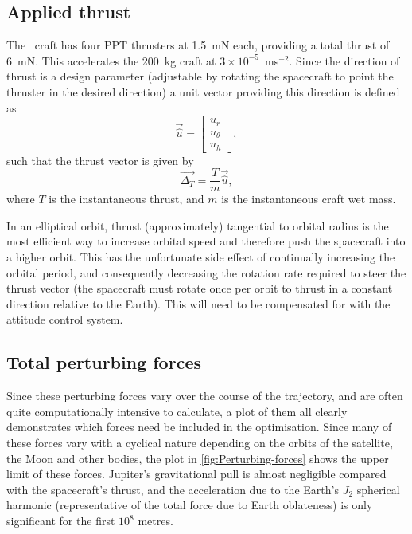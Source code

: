 
 

\subsection{Applied thrust} \label{sub:Applied-Thrust}

The \BW\ craft has four PPT thrusters at 1.5~mN each, providing a total thrust of 6~mN. This accelerates the 200~kg craft at $3\times10^{-5}$~ms$^{-2}$. Since the direction of thrust is a design parameter (adjustable by rotating the spacecraft to point the thruster in the desired direction) a unit vector providing this direction is defined as
\begin{equation} \label{eq:thrust-vector}
\vec{\hat{u}}=\left[\begin{array}{c}
u_{r}\\
u_{\theta}\\
u_{h}
\end{array}\right],
\end{equation}
such that the thrust vector is given by
\begin{equation}
\vec{\Delta_{T}}=\frac{T}{m}\vec{\hat{u}} \label{eq:thrust-perturbation},
\end{equation}
where $T$ is the instantaneous thrust, and $m$ is the instantaneous craft wet mass.

In an elliptical orbit, thrust (approximately) tangential to orbital radius is the most efficient way to increase orbital speed and therefore push the spacecraft into a higher orbit. This has the unfortunate side effect of continually increasing the orbital period, and consequently decreasing the rotation rate required to steer the thrust vector (the spacecraft must rotate once per orbit to thrust in a constant direction relative to the Earth). This will need to be compensated for with the attitude control system.

\subsection{Total perturbing forces}

Since these perturbing forces vary over the course of the trajectory, and are often quite computationally intensive to calculate, a plot of them all clearly demonstrates which forces need be included in the optimisation. Since many of these forces vary with a cyclical nature depending on the orbits of the satellite, the Moon and other bodies, the plot in \autoref{fig:Perturbing-forces} shows the upper limit of these forces. Jupiter's gravitational pull is almost negligible compared with the spacecraft's thrust, and the acceleration due to the Earth's $J_{2}$ spherical harmonic (representative of the total force due to Earth oblateness) is only significant for the first $10^{8}$ metres.

